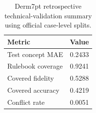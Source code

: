 \begin{table}[H]
\caption{Derm7pt retrospective technical-validation summary using official case-level splits.\label{tab:derm7pt_summary_dataset_local}}
\centering
\small
\begin{tabular}{lc}
\toprule
Metric & Value \\
\midrule
Test concept MAE & 0.2433 \\
Rulebook coverage & 0.9241 \\
Covered fidelity & 0.5288 \\
Covered accuracy & 0.4219 \\
Conflict rate & 0.0051 \\
\bottomrule
\end{tabular}
\end{table}
